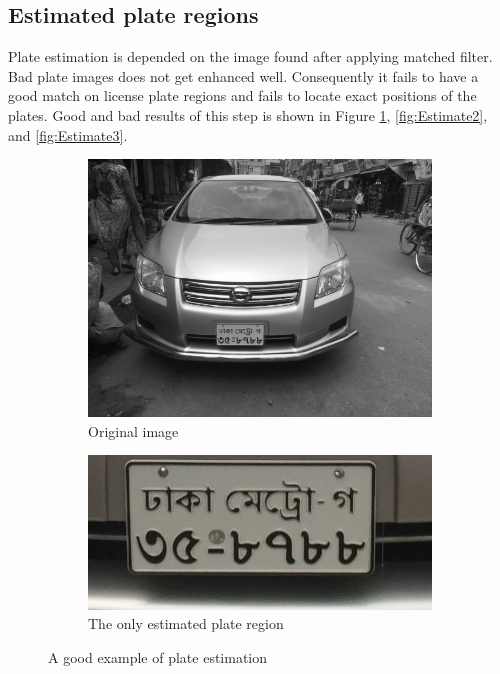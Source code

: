\subsection{Estimated plate regions}
Plate estimation is depended on the image found after applying matched filter. Bad plate images does not get enhanced well. Consequently it fails to have a good match on license plate regions and fails to locate exact positions of the plates. Good and bad results of this step is shown in Figure \ref{fig:Estimate1}, \ref{fig:Estimate2}, and \ref{fig:Estimate3}.

\begin{figure}
\begin{subfigure}{0.5\textwidth}
    \centering
    \includegraphics[width=0.9\linewidth]{./img/experiment/stage.2/good}
    \caption{Original image}
\end{subfigure}
\begin{subfigure}{0.5\textwidth}
    \centering
    \includegraphics[width=0.9\linewidth]{./img/experiment/stage.8/00-good}
    \caption{The only estimated plate region}
\end{subfigure}
\caption{A good example of plate estimation}
\label{fig:Estimate1}
\end{figure}


